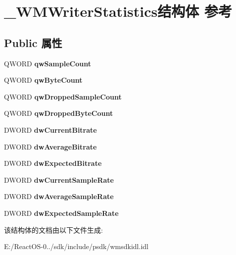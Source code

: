 \hypertarget{struct___w_m_writer_statistics}{}\section{\+\_\+\+W\+M\+Writer\+Statistics结构体 参考}
\label{struct___w_m_writer_statistics}
\subsection*{Public 属性}
\begin{DoxyCompactItemize}
\item 
\mbox{\label{struct___w_m_writer_statistics_af90079dc46c1a26109fd5b9967e1c0af}} 
Q\+W\+O\+RD {\bfseries qw\+Sample\+Count}
\item 
\mbox{\label{struct___w_m_writer_statistics_aea0ab130de361067eca73dcfb116684f}} 
Q\+W\+O\+RD {\bfseries qw\+Byte\+Count}
\item 
\mbox{\label{struct___w_m_writer_statistics_aba8d853bf9d1b1fc2e903e689a00c8ef}} 
Q\+W\+O\+RD {\bfseries qw\+Dropped\+Sample\+Count}
\item 
\mbox{\label{struct___w_m_writer_statistics_a932dffd27287340a7a7fc0d11c374cf8}} 
Q\+W\+O\+RD {\bfseries qw\+Dropped\+Byte\+Count}
\item 
\mbox{\label{struct___w_m_writer_statistics_a6373dc21028e8222bd7798e314bcfd87}} 
D\+W\+O\+RD {\bfseries dw\+Current\+Bitrate}
\item 
\mbox{\label{struct___w_m_writer_statistics_aade56bc4b7024976d2d44e52033b45e0}} 
D\+W\+O\+RD {\bfseries dw\+Average\+Bitrate}
\item 
\mbox{\label{struct___w_m_writer_statistics_a021b86e43f02988e37a6bac23ccfb217}} 
D\+W\+O\+RD {\bfseries dw\+Expected\+Bitrate}
\item 
\mbox{\label{struct___w_m_writer_statistics_af079b26f426845a8826f113cfe89086c}} 
D\+W\+O\+RD {\bfseries dw\+Current\+Sample\+Rate}
\item 
\mbox{\label{struct___w_m_writer_statistics_a3bbb7d9db3beacc65aa7e2acf73e151c}} 
D\+W\+O\+RD {\bfseries dw\+Average\+Sample\+Rate}
\item 
\mbox{\label{struct___w_m_writer_statistics_adaf716d848007c272025ebb1f85e9de9}} 
D\+W\+O\+RD {\bfseries dw\+Expected\+Sample\+Rate}
\end{DoxyCompactItemize}


该结构体的文档由以下文件生成\+:\begin{DoxyCompactItemize}
\item 
E\+:/\+React\+O\+S-\/0../sdk/include/psdk/wmsdkidl.\+idl\end{DoxyCompactItemize}

